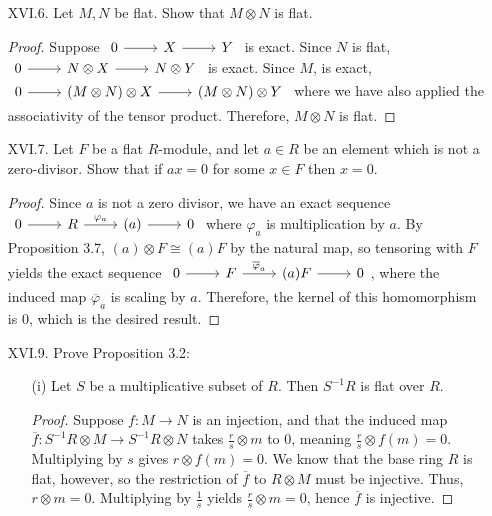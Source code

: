 \documentclass[10pt]{article}
\renewcommand{\bar}{\overline}
\begin{document}
\begin{enumerate}
\begin{enumerate}
\begin{proof}
\end{proof}

\end{enumerate}

\item[XVI.6.] Let $M,N$ be flat.  Show that $M \otimes N$ is flat.

\begin{proof}
Suppose
$
\begin{tikzcd}
0 \arrow[r] & X \arrow[r] & Y
\end{tikzcd}
$
is exact.  Since $N$ is flat, 
$
\begin{tikzcd}
0 \arrow[r] & N \otimes X \arrow[r] & N \otimes Y
\end{tikzcd}
$
is exact.  Since $M$, is exact,
$
\begin{tikzcd}
0 \arrow[r] & (M \otimes N) \otimes X \arrow[r] & (M \otimes N) \otimes Y
\end{tikzcd}
$
where we have also applied the associativity of the tensor product.  Therefore, $M \otimes N$ is flat.
\end{proof}

\item[XVI.7.] Let $F$ be a flat $R$-module, and let $a \in R$ be an element which is not a zero-divisor.  Show that if $ax = 0$ for some $x \in F$ then $x = 0$.

\begin{proof}
Since $a$ is not a zero divisor, we have an exact sequence $\begin{tikzcd} 0 \arrow[r] & R \arrow[r, "\varphi_a"] & (a) \arrow[r] & 0 \end{tikzcd}$ where $\varphi_a$ is multiplication by $a$.  By Proposition 3.7, $(a) \otimes F \cong (a)F$ by the natural map, so tensoring with $F$ yields the exact sequence $\begin{tikzcd} 0 \arrow[r] & F \arrow[r, "\bar{\varphi}_a"] & (a)F \arrow[r] & 0 \end{tikzcd}$, where the induced map $\bar{\varphi}_a$ is scaling by $a$.  Therefore, the kernel of this homomorphism is $0$, which is the desired result.
\end{proof}

\item[XVI.9.] Prove Proposition 3.2:
\begin{enumerate}
\item[(i)] Let $S$ be a multiplicative subset of $R$.  Then $S^{-1}R$ is flat over $R$.

\begin{proof}
Suppose $f: M \rightarrow N$ is an injection, and that the induced map $\bar{f}:S^{-1}R \otimes M \rightarrow S^{-1}R \otimes N$ takes $\frac{r}{s} \otimes m$ to $0$, meaning $\frac{r}{s} \otimes f(m) = 0$.  Multiplying by $s$ gives $r \otimes f(m) = 0$.  We know that the base ring $R$ is flat, however, so the restriction of $\bar{f}$ to $R \otimes M$ must be injective.  Thus, $r \otimes m = 0$.  Multiplying by $\frac{1}{s}$ yields $\frac{r}{s} \otimes m = 0$, hence $\bar{f}$ is injective.
\end{proof}


\end{enumerate}
\end{enumerate}
\end{document}

